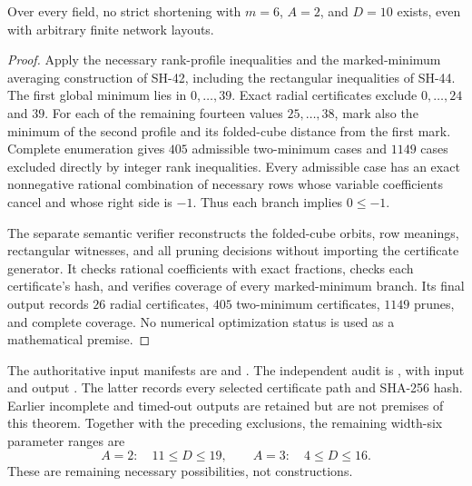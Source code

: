 \begin{theorem}
\label{thm:width-six-dimension-ten}
Over every field, no strict shortening with $m=6$, $A=2$,
and $D=10$ exists, even with arbitrary finite network layouts.
\end{theorem}
\begin{proof}
Apply the necessary rank-profile inequalities and the
marked-minimum averaging construction of SH-42, including
the rectangular inequalities of SH-44.  The first global
minimum lies in $0,\ldots,39$.  Exact radial certificates
exclude $0,\ldots,24$ and $39$.  For each of the remaining
fourteen values $25,\ldots,38$, mark also the minimum of
the second profile and its folded-cube distance from the
first mark.  Complete enumeration gives $405$ admissible
two-minimum cases and $1149$ cases excluded directly by
integer rank inequalities.  Every admissible case has an
exact nonnegative rational combination of necessary rows
whose variable coefficients cancel and whose right side
is $-1$.  Thus each branch implies $0\leq-1$.

The separate semantic verifier reconstructs the folded-cube
orbits, row meanings, rectangular witnesses, and all
pruning decisions without importing the certificate
generator.  It checks rational coefficients with exact
fractions, checks each certificate's hash, and verifies
coverage of every marked-minimum branch.  Its final
output records $26$ radial certificates, $405$
two-minimum certificates, $1149$ prunes, and complete
coverage.  No numerical optimization status is used
as a mathematical premise.
\end{proof}

The authoritative input manifests are
 and
.
The independent audit is
,
with input 
and output .
The latter records every selected certificate path and
SHA-256 hash.  Earlier incomplete and timed-out outputs
are retained but are not premises of this theorem.
Together with the preceding exclusions, the remaining
width-six parameter ranges are
\[
 A=2:\quad 11\leq D\leq19,
 \qquad
 A=3:\quad 4\leq D\leq16.
\]
These are remaining necessary possibilities, not
constructions.

